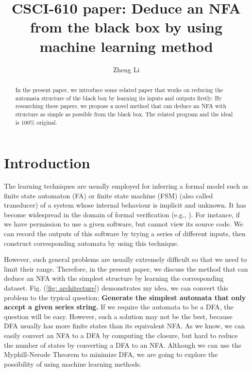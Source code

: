 \documentclass{article}
\begin{document}
\title{CSCI-610 paper: Deduce an NFA from the black box by using machine learning method}

\author{Zheng Li}
\maketitle


\begin{abstract}
    In the present paper, we introduce some related paper that works on reducing the automata structure of the black box by learning its inputs and outputs firstly. 
    By researching these papers,  we propose a novel method that can deduce an NFA with structure as simple as possible from the black box. The related program and the ideal is 100\% original. 
\end{abstract}

\section{Introduction}
The learning techniques are usually employed for inferring a formal model such as finite state automaton (FA) or finite state machine (FSM) (also called transducer) of a system whose internal behaviour is implicit and unknown. It has become widespread in the domain of formal verification (e.g., \cite{peled1999black,groce2002adaptive,cobleigh2003learning,chaki2008verification}).
For instance, if we have permission to use a given software, but cannot view its source code. We can record the outputs of this software by trying a series of different inputs, then construct corresponding automata by using this technique. 


However, such general problems are usually extremely difficult\cite{pacharoen2013active} so that we need to limit their range. Therefore, in the present paper, we discuss the method that can deduce an NFA with the simplest structure by learning the corresponding dataset. Fig. (\ref{fig: architecture}) demonstrates my idea, we can convert this problem to the typical question: \textbf{Generate the simplest automata that only accept a given series string.} If we require the automata to be a DFA, the question will be easy. However, such a solution may not be the best, because DFA usually has more finite states than its equivalent NFA. As we know, we can easily convert an NFA to a DFA by computing the closure, but hard to reduce the number of states by converting a DFA to an NFA. Although we can use the Myphill-Nerode Theorem\cite{nerode1958linear} to minimize DFA, we are going to explore the possibility of using machine learning methods.
\end{document}
